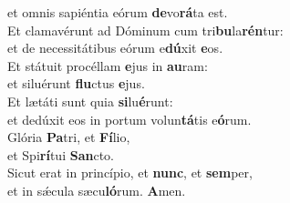 \oddverse et omnis sapiéntia eórum \textbf{de}vo\textbf{rá}ta est.\\
\evenverse Et clamavérunt ad Dóminum cum tri\textbf{bu}la\textbf{rén}tur:~\*\\
\evenverse et de necessitátibus eórum e\textbf{dú}xit \textbf{e}os.\\
\oddverse Et státuit procéllam \textbf{e}jus in \textbf{au}ram:~\*\\
\oddverse et siluérunt \textbf{flu}ctus \textbf{e}jus.\\
\evenverse Et lætáti sunt quia \textbf{si}lu\textbf{é}runt:~\*\\
\evenverse et dedúxit eos in portum volun\textbf{tá}tis e\textbf{ó}rum.\\
\oddverse Glória \textbf{Pa}tri, et \textbf{Fí}lio,~\*\\
\oddverse et Spi\textbf{rí}tui \textbf{San}cto.\\
\evenverse Sicut erat in princípio, et \textbf{nunc}, et \textbf{sem}per,~\*\\
\evenverse et in sǽcula sæcu\textbf{ló}rum. \textbf{A}men.\\
